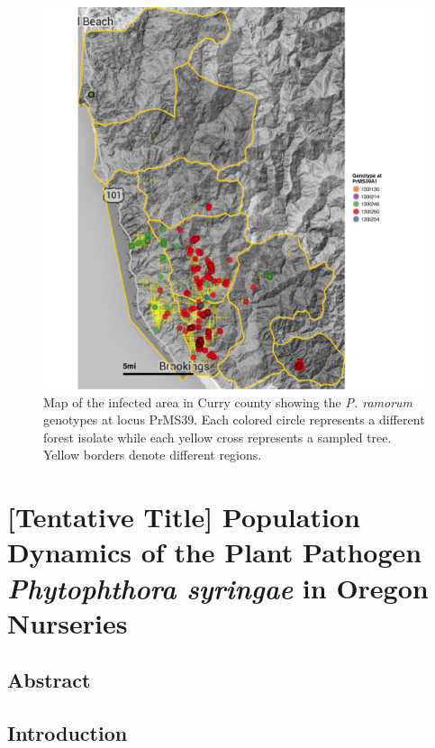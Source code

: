\documentclass[double,12pt]{beavtex}
\begin{document}
  \begin{figure}
  
  {\centering \includegraphics[width=0.8\linewidth]{figure/phytopathology/figureS10} 
  
  }
  
  \caption[Map of the infected area in Curry county showing the \emph{P. ramorum}
  genotypes at locus PrMS39.]{Map of the infected area in Curry county showing the \emph{P. ramorum}
  genotypes at locus PrMS39. Each colored circle represents a different
  forest isolate while each yellow cross represents a sampled tree. Yellow
  borders denote different regions.}\label{fig:ramS10}
  \end{figure}
  
  \chapter{\texorpdfstring{{[}Tentative Title{]} Population Dynamics of
  the Plant Pathogen \emph{Phytophthora syringae} in Oregon
  Nurseries}{{[}Tentative Title{]} Population Dynamics of the Plant Pathogen Phytophthora syringae in Oregon Nurseries}}\label{tentative-title-population-dynamics-of-the-plant-pathogen-phytophthora-syringae-in-oregon-nurseries}
  
  \section{Abstract}\label{abstract-3}
  
  \section{Introduction}\label{introduction-3}
  
\end{document}
